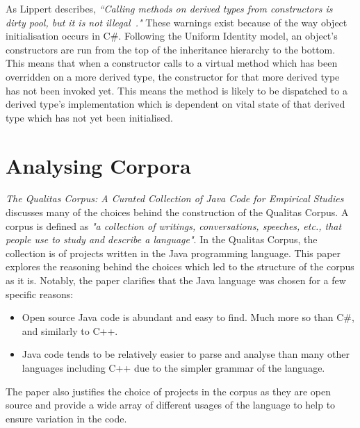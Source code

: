 As Lippert describes, \textit{``Calling methods on derived types from constructors is dirty pool, but it is not illegal~\cite{NoDowncalls}."} These warnings exist because of the way object initialisation occurs in C\#. Following the Uniform Identity model, an object's constructors are run from the top of the inheritance hierarchy to the bottom. This means that when a constructor calls to a virtual method which has been overridden on a more derived type, the constructor for that more derived type has not been invoked yet. This means the method is likely to be dispatched to a derived type's implementation which is dependent on vital state of that derived type which has not yet been initialised.

\section{Analysing Corpora}
\textit{The Qualitas Corpus: A Curated Collection of Java Code for Empirical Studies~\cite{QualitasCorpus}} discusses many of the choices behind the construction of the Qualitas Corpus. A corpus is defined as \textit{"a collection of writings, conversations, speeches, etc., that people use to study and describe a language"}. In the Qualitas Corpus, the collection is of projects written in the Java programming language. This paper explores the reasoning behind the choices which led to the structure of the corpus as it is. Notably, the paper clarifies that the Java language was chosen for a few specific reasons:
\begin{itemize}
	\item Open source Java code is abundant and easy to find. Much more so than C\#, and similarly to C++.
	\item Java code tends to be relatively easier to parse and analyse than many other languages including C++ due to the simpler grammar of the language.\newline
\end{itemize}

The paper also justifies the choice of projects in the corpus as they are open source and provide a wide array of different usages of the language to help to ensure variation in the code.
\newline

